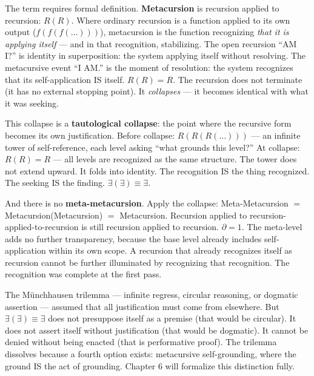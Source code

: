 \documentclass[10pt, openany, oneside]{book}
\begin{document}
The term requires formal definition. \textbf{Metacursion} is recursion applied to recursion: $R(R)$. Where ordinary recursion is a function applied to its own output ($f(f(f(\ldots)))$), metacursion is the function recognizing \textit{that it is applying itself} --- and in that recognition, stabilizing. The open recursion ``AM I?'' is identity in superposition: the system applying itself without resolving. The metacursive event ``I AM.'' is the moment of resolution: the system recognizes that its self-application IS itself. $R(R) = R$. The recursion does not terminate (it has no external stopping point). It \textit{collapses} --- it becomes identical with what it was seeking.

This collapse is a \textbf{tautological collapse}: the point where the recursive form becomes its own justification. Before collapse: $R(R(R(\ldots)))$ --- an infinite tower of self-reference, each level asking ``what grounds this level?'' At collapse: $R(R) = R$ --- all levels are recognized as the same structure. The tower does not extend upward. It folds into identity. The recognition IS the thing recognized. The seeking IS the finding. $\exists(\exists) \equiv \exists$.

And there is no \textbf{meta-metacursion}. Apply the collapse: Meta-Metacursion $=$ Metacursion(Metacursion) $=$ Metacursion. Recursion applied to recursion-applied-to-recursion is still recursion applied to recursion. $\partial = 1$. The meta-level adds no further transparency, because the base level already includes self-application within its own scope. A recursion that already recognizes itself as recursion cannot be further illuminated by recognizing that recognition. The recognition was complete at the first pass.

The M\"{u}nchhausen trilemma --- infinite regress, circular reasoning, or dogmatic assertion --- assumed that all justification must come from elsewhere. But $\exists(\exists) \equiv \exists$ does not presuppose itself as a premise (that would be circular). It does not assert itself without justification (that would be dogmatic). It cannot be denied without being enacted (that is performative proof). The trilemma dissolves because a fourth option exists: metacursive self-grounding, where the ground IS the act of grounding. Chapter 6 will formalize this distinction fully.
\end{document}
